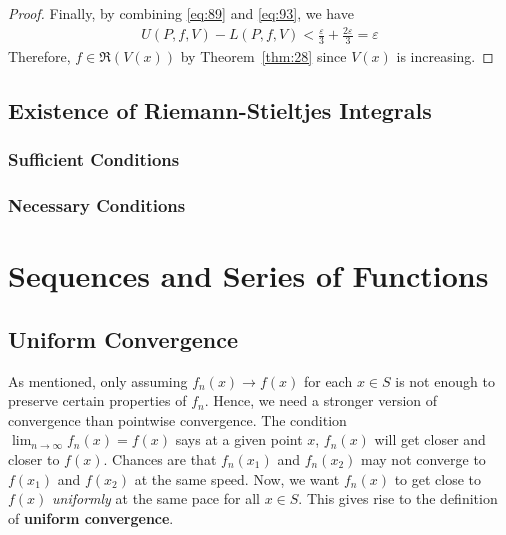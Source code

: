 \documentclass[thmcnt=section, 12pt]{my-elegantbook}
\begin{document}
\begin{proof}
    \par Finally, by combining \eqref{eq:89} and \eqref{eq:93}, we have 
    \begin{align*}
        U(P,f,V) - L(P,f,V)
        < \frac{\varepsilon}{3} + \frac{2\varepsilon}{3}
        = \varepsilon
    \end{align*}
    Therefore, $f \in \mathfrak{R}(V(x))$ by Theorem~\ref{thm:28} since $V(x)$ is increasing.
\end{proof}


\section{Existence of Riemann-Stieltjes Integrals}


\subsection{Sufficient Conditions}




\subsection{Necessary Conditions}


\chapter{Sequences and Series of Functions}


\section{Uniform Convergence}

As mentioned, only assuming $f_n(x) \to f(x)$ for each $x \in S$ is not enough to preserve certain properties of $f_n$. Hence, we need a stronger version of convergence than pointwise convergence. The condition $\lim_{n \to \infty} f_n(x) = f(x)$ says at a given point $x$, $f_n(x)$ will get closer and closer to $f(x)$. Chances are that $f_n(x_1)$ and $f_n(x_2)$ may not converge to $f(x_1)$ and $f(x_2)$ at the same speed. Now, we want $f_n(x)$ to get close to $f(x)$ \textit{uniformly} at the same pace for all $x \in S$. This gives rise to the definition of \textbf{uniform convergence}.
\end{document}
